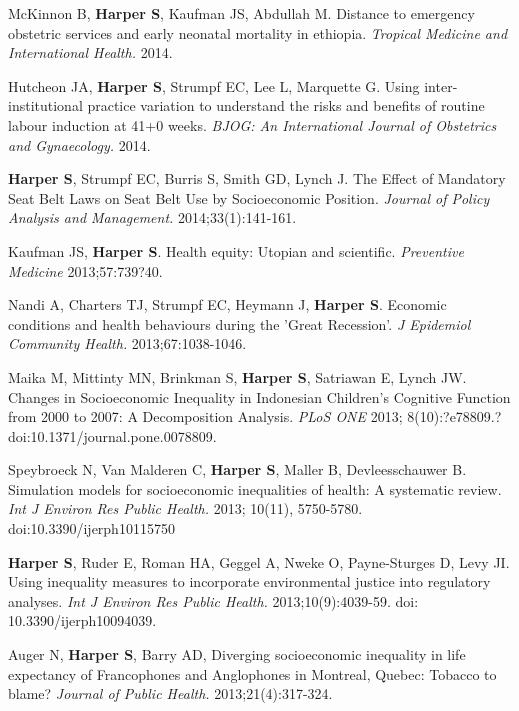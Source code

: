 \documentclass[
  letterpaper,
  DIV=11,
  numbers=noendperiod]{scrartcl}
\begin{document}
\begin{etaremune}
\item *McKinnon B, \textbf{Harper S}, Kaufman JS, Abdullah M. Distance to emergency obstetric services and early neonatal mortality in ethiopia. \emph{Tropical Medicine and International Health.} 2014.
 
\item Hutcheon JA, \textbf{Harper S}, Strumpf EC, Lee L, Marquette G. Using inter-institutional practice variation to understand the risks and benefits of routine labour induction at 41+0 weeks. \emph{BJOG: An International Journal of Obstetrics and Gynaecology.} 2014.
 
\item \textbf{Harper S}, Strumpf EC, Burris S, Smith GD, Lynch J. The Effect of Mandatory Seat Belt Laws on Seat Belt Use by Socioeconomic Position. \emph{Journal of Policy Analysis and Management.} 2014;33(1):141-161.

\item Kaufman JS, \textbf{Harper S}. Health equity: Utopian and scientific. \emph{Preventive Medicine} 2013;57:739?40.
 
\item Nandi A, Charters TJ, Strumpf EC, Heymann J, \textbf{Harper S}. Economic conditions and health behaviours during the 'Great Recession'. \emph{J Epidemiol Community Health.} 2013;67:1038-1046.
 
\item Maika M, Mittinty MN, Brinkman S, \textbf{Harper S}, Satriawan E, Lynch JW. Changes in Socioeconomic Inequality in Indonesian Children's Cognitive Function from 2000 to 2007: A Decomposition Analysis.  \emph{PLoS ONE} 2013; 8(10):?e78809.?doi:10.1371/journal.pone.0078809.
 
\item Speybroeck N, Van Malderen C, \textbf{Harper S}, Maller B, Devleesschauwer B. Simulation models for socioeconomic inequalities of health: A systematic review. \emph{Int J Environ Res Public Health.} 2013; 10(11), 5750-5780. doi:10.3390/ijerph10115750
 
\item \textbf{Harper S}, Ruder E, Roman HA, Geggel A, Nweke O, Payne-Sturges D, Levy JI. Using inequality measures to incorporate environmental justice into regulatory analyses. \emph{Int J Environ Res Public Health.} 2013;10(9):4039-59. doi: 10.3390/ijerph10094039.
 
\item Auger N, \textbf{Harper S}, Barry AD, Diverging socioeconomic inequality in life expectancy of Francophones and Anglophones in Montreal, Quebec: Tobacco to blame? \emph{Journal of Public Health.} 2013;21(4):317-324.
 

\end{etaremune}
\end{document}
